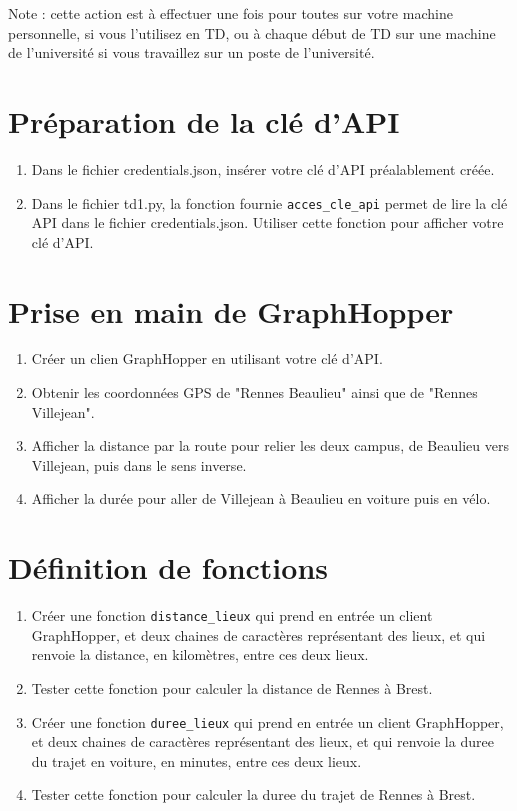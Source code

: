\documentclass[11pt,a4paper]{article}
\begin{document}
Note : cette action est à effectuer une fois pour toutes sur votre machine personnelle, si vous l’utilisez en TD, ou à chaque début de TD sur une machine de l’université si vous travaillez sur un poste de l’université.

\section{Préparation de la clé d'API}
\begin{enumerate}
    \item Dans le fichier credentials.json, insérer votre clé d'API préalablement créée.
    \item Dans le fichier td1.py, la fonction fournie \verb+acces_cle_api+ permet de lire la clé API dans le fichier credentials.json. 
    Utiliser cette fonction pour afficher votre clé d'API.
\end{enumerate}
        
\section{Prise en main de GraphHopper}
\begin{enumerate}
    \item Créer un clien GraphHopper en utilisant votre clé d'API.
    \item Obtenir les coordonnées GPS de "Rennes Beaulieu" ainsi que de "Rennes Villejean".
    \item Afficher la distance par la route pour relier les deux campus, de Beaulieu vers Villejean, puis dans le sens inverse.
    \item Afficher la durée pour aller de Villejean à Beaulieu en voiture puis en vélo. 
\end{enumerate}

\section{Définition de fonctions}
\begin{enumerate}
    \item Créer une fonction \verb+distance_lieux+ qui prend en entrée un client GraphHopper, et deux chaines de caractères représentant des lieux, et qui renvoie la distance, en kilomètres, entre ces deux lieux.
    \item Tester cette fonction pour calculer la distance de Rennes à Brest.
    \item Créer une fonction \verb+duree_lieux+ qui prend en entrée un client GraphHopper, et deux chaines de caractères représentant des lieux, et qui renvoie la duree du trajet en voiture, en minutes, entre ces deux lieux.
    \item Tester cette fonction pour calculer la duree du trajet de Rennes à Brest.
\end{enumerate}
\end{document}
